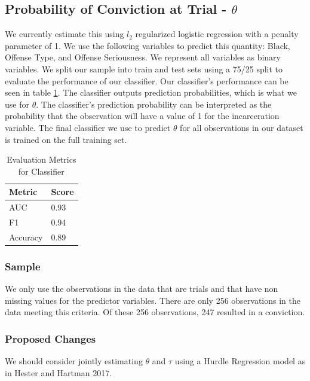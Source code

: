 \documentclass[11pt]{article}
\theoremstyle{ModifiedStyle}
\begin{document}
  \subsection{Probability of Conviction at Trial - $\theta$}
    \label{theta-estimation}
    We currently estimate this using $l_2$ regularized logistic regression with a penalty parameter of 1. We use the following variables to predict this quantity: Black, Offense Type, and Offense Seriousness. We represent all variables as binary variables. We split our sample into train and test sets using a 75/25 split to evaluate the performance of our classifier. Our classifier's performance can be seen in table \ref{classifier-performance}. The classifier outputs prediction probabilities, which is what we use for $\theta$. The classifier's prediction probability can be interpreted as the probability that the observation will have a value of 1 for the incarceration variable. The final classifier we use to predict $\theta$ for all observations in our dataset is trained on the full training set.

    \begin{table}[H]
      \centering
      \caption{Evaluation Metrics for Classifier}
      \label{classifier-performance}
      \begin{tabular}{|l|l|}
      \hline
      \textbf{Metric} & \textbf{Score} \\ \hline
      AUC             & 0.93           \\ \hline
      F1              & 0.94           \\ \hline
      Accuracy        & 0.89           \\ \hline
      \end{tabular}
    \end{table}

    \subsubsection{Sample}
      We only use the observations in the data that are trials and that have non missing values for the predictor variables. There are only 256 observations in the data meeting this criteria. Of these 256 observations, 247 resulted in a conviction.

    \subsubsection{Proposed Changes}
      We should consider jointly estimating $\theta$ and $\tau$ using a Hurdle Regression model as in Hester and Hartman 2017.
\end{document}
